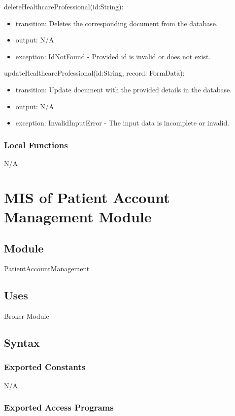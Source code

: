 \documentclass[12pt, titlepage]{article}
\begin{document}
\noindent deleteHealthcareProfessional(id:String):
\begin{itemize}
\item transition: Deletes the corresponding document from the database.
\item output: N/A
\item exception: IdNotFound - Provided id is invalid or does not exist.
\end{itemize}

\noindent updateHealthcareProfessional(id:String, record: FormData):
\begin{itemize}
\item transition: Update document with the provided details in the database.
\item output: N/A
\item exception: InvalidInputError - The input data is incomplete or invalid.
\end{itemize}

\subsubsection{Local Functions}

N/A

\newpage

\section{MIS of Patient Account Management Module} \label{Module_PatientAccountManag}

\subsection{Module}
PatientAccountManagement

\subsection{Uses}
Broker Module\\

\subsection{Syntax}

\subsubsection{Exported Constants}
N/A

\subsubsection{Exported Access Programs}
\end{document}
